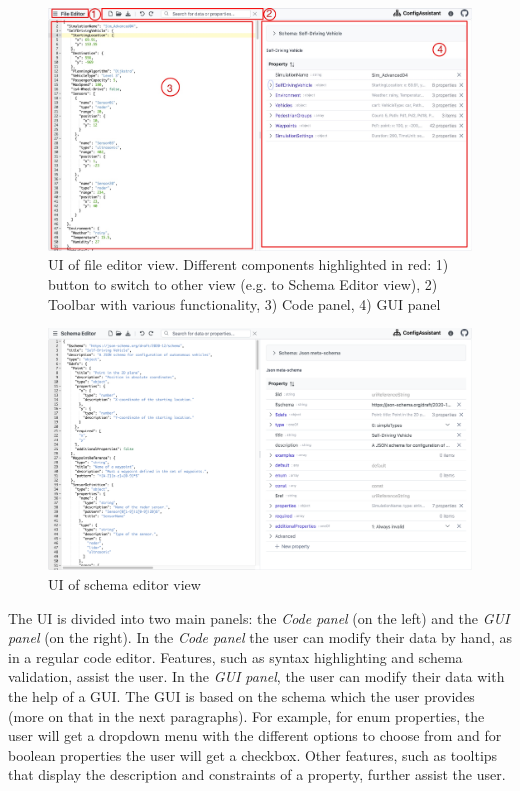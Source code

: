 \begin{figure}
    \includegraphics[width=\textwidth]{figures/fileeditor}
    \caption{UI of file editor view. Different components highlighted in red: 1) button to switch to other view (e.g. to Schema Editor view), 2) Toolbar with various functionality, 3) Code panel, 4) GUI panel}
    \label{fig:fileeditor}
\end{figure}

\begin{figure}
    \includegraphics[width=\textwidth]{figures/schemaeditor}
    \caption{UI of schema editor view}
    \label{fig:schemaeditor}
\end{figure}


The UI is divided into two main panels: the  \textit{Code panel} (on the left) and the \textit{GUI panel} (on the right).
In the \textit{Code panel} the user can modify their data by hand, as in a regular code editor.
Features, such as syntax highlighting and schema validation, assist the user.
In the \textit{GUI panel}, the user can modify their data with the help of a GUI.
The GUI is based on the schema which the user provides (more on that in the next paragraphs).
For example, for enum properties, the user will get a dropdown menu with the different options to choose from and for boolean properties the user will get a checkbox.
Other features, such as tooltips that display the description and constraints of a property, further assist the user.

